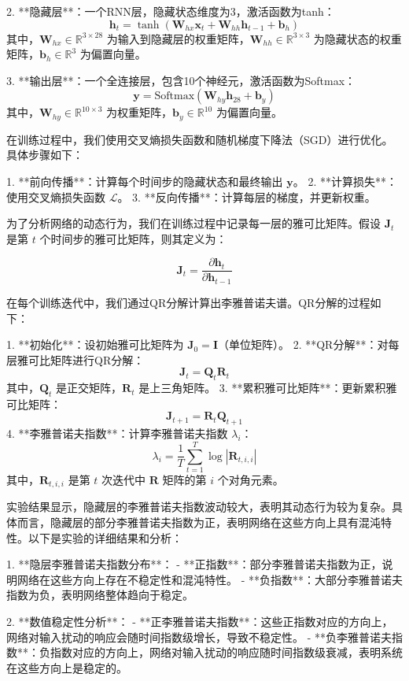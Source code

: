 \documentclass[12pt,a4paper]{amsart}
\begin{document}
2. **隐藏层**：一个RNN层，隐藏状态维度为3，激活函数为tanh：
   \[
   \mathbf{h}_t = \tanh(\mathbf{W}_{hx} \mathbf{x}_t + \mathbf{W}_{hh} \mathbf{h}_{t-1} + \mathbf{b}_h)
   \]
   其中，\(\mathbf{W}_{hx} \in \mathbb{R}^{3 \times 28}\) 为输入到隐藏层的权重矩阵，\(\mathbf{W}_{hh} \in \mathbb{R}^{3 \times 3}\) 为隐藏状态的权重矩阵，\(\mathbf{b}_h \in \mathbb{R}^{3}\) 为偏置向量。

3. **输出层**：一个全连接层，包含10个神经元，激活函数为Softmax：
   \[
   \mathbf{y} = \text{Softmax}(\mathbf{W}_{hy} \mathbf{h}_{28} + \mathbf{b}_y)
   \]
   其中，\(\mathbf{W}_{hy} \in \mathbb{R}^{10 \times 3}\) 为权重矩阵，\(\mathbf{b}_y \in \mathbb{R}^{10}\) 为偏置向量。

在训练过程中，我们使用交叉熵损失函数和随机梯度下降法（SGD）进行优化。具体步骤如下：

1. **前向传播**：计算每个时间步的隐藏状态和最终输出 \(\mathbf{y}\)。
2. **计算损失**：使用交叉熵损失函数 \(\mathcal{L}\)。
3. **反向传播**：计算每层的梯度，并更新权重。

为了分析网络的动态行为，我们在训练过程中记录每一层的雅可比矩阵。假设 \(\mathbf{J}_t\) 是第 \(t\) 个时间步的雅可比矩阵，则其定义为：

\[
\mathbf{J}_t = \frac{\partial \mathbf{h}_t}{\partial \mathbf{h}_{t-1}}
\]

在每个训练迭代中，我们通过QR分解计算出李雅普诺夫谱。QR分解的过程如下：

1. **初始化**：设初始雅可比矩阵为 \(\mathbf{J}_0 = \mathbf{I}\)（单位矩阵）。
2. **QR分解**：对每层雅可比矩阵进行QR分解：
   \[
   \mathbf{J}_t = \mathbf{Q}_t \mathbf{R}_t
   \]
   其中，\(\mathbf{Q}_t\) 是正交矩阵，\(\mathbf{R}_t\) 是上三角矩阵。
3. **累积雅可比矩阵**：更新累积雅可比矩阵：
   \[
   \mathbf{J}_{t+1} = \mathbf{R}_t \mathbf{Q}_{t+1}
   \]
4. **李雅普诺夫指数**：计算李雅普诺夫指数 \(\lambda_i\)：
   \[
   \lambda_i = \frac{1}{T} \sum_{t=1}^T \log |\mathbf{R}_{t,i,i}|
   \]
   其中，\(\mathbf{R}_{t,i,i}\) 是第 \(t\) 次迭代中 \(\mathbf{R}\) 矩阵的第 \(i\) 个对角元素。

实验结果显示，隐藏层的李雅普诺夫指数波动较大，表明其动态行为较为复杂。具体而言，隐藏层的部分李雅普诺夫指数为正，表明网络在这些方向上具有混沌特性。以下是实验的详细结果和分析：

1. **隐层李雅普诺夫指数分布**：
   - **正指数**：部分李雅普诺夫指数为正，说明网络在这些方向上存在不稳定性和混沌特性。
   - **负指数**：大部分李雅普诺夫指数为负，表明网络整体趋向于稳定。

2. **数值稳定性分析**：
   - **正李雅普诺夫指数**：这些正指数对应的方向上，网络对输入扰动的响应会随时间指数级增长，导致不稳定性。
   - **负李雅普诺夫指数**：负指数对应的方向上，网络对输入扰动的响应随时间指数级衰减，表明系统在这些方向上是稳定的。
\end{document}
